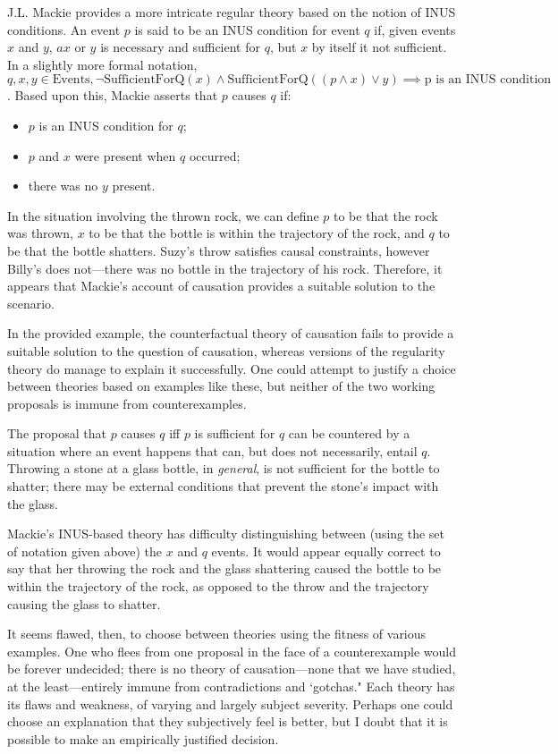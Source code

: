 \documentclass{article}
\begin{document}
J.L. Mackie provides a more intricate regular theory based on the notion of INUS conditions. An event $p$ is said to be an INUS condition for event $q$ if, given events $x$ and $y$, $ax$ or $y$ is necessary and sufficient for $q$, but $x$ by itself it not sufficient. In a slightly more formal notation, $q, x, y \in \text{Events}, \lnot\mathrm{SufficientForQ}(x) \land \mathrm{SufficientForQ}((p \land x) \lor y) \implies \text{p is an INUS condition}$. Based upon this, Mackie asserts that $p$ causes $q$ if:

    \begin{itemize}
    \item $p$ is an INUS condition for $q$;
    \item $p$ and $x$ were present when $q$ occurred;
    \item there was no $y$ present.
    \end{itemize}

In the situation involving the thrown rock, we can define $p$ to be that the rock was thrown, $x$ to be that the bottle is within the trajectory of the rock, and $q$ to be that the bottle shatters. Suzy's throw satisfies causal constraints, however Billy's does not---there was no bottle in the trajectory of his rock. Therefore, it appears that Mackie's account of causation provides a suitable solution to the scenario.

\medbreak

In the provided example, the counterfactual theory of causation fails to provide a suitable solution to the question of causation, whereas versions of the regularity theory do manage to explain it successfully. One could attempt to justify a choice between theories based on examples like these, but neither of the two working proposals is immune from counterexamples.

The proposal that $p$ causes $q$ iff $p$ is sufficient for $q$ can be countered by a situation where an event happens that can, but does not necessarily, entail $q$. Throwing a stone at a glass bottle, in \textit{general}, is not sufficient for the bottle to shatter; there may be external conditions that prevent the stone's impact with the glass.

Mackie's INUS-based theory has difficulty distinguishing between (using the set of notation given above) the $x$ and $q$ events. It would appear equally correct to say that her throwing the rock and the glass shattering caused the bottle to be within the trajectory of the rock, as opposed to the throw and the trajectory causing the glass to shatter.

It seems flawed, then, to choose between theories using the fitness of various examples. One who flees from one proposal in the face of a counterexample would be forever undecided; there is no theory of causation---none that we have studied, at the least---entirely immune from contradictions and `gotchas." Each theory has its flaws and weakness, of varying and largely subject severity. Perhaps one could choose an explanation that they subjectively feel is better, but I doubt that it is possible to make an empirically justified decision.
\end{document}
